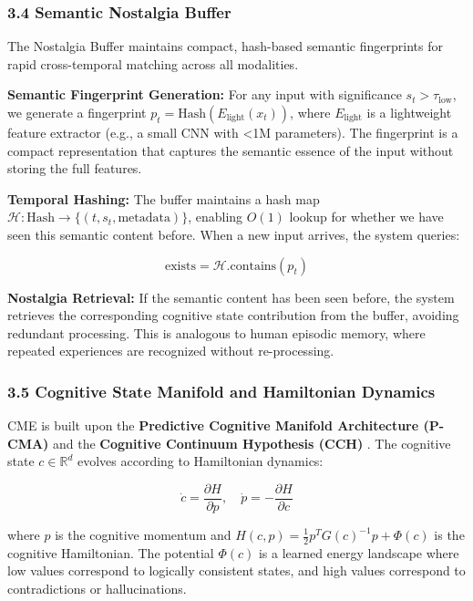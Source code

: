 \documentclass[
  11pt,
  a4paper,
]{article}
\begin{document}
\subsubsection{3.4 Semantic Nostalgia
Buffer}\label{semantic-nostalgia-buffer}

The Nostalgia Buffer maintains compact, hash-based semantic fingerprints
for rapid cross-temporal matching across all modalities.

\textbf{Semantic Fingerprint Generation:} For any input with
significance \(s_t > \tau_{\text{low}}\), we generate a fingerprint
\(p_t = \text{Hash}(E_{\text{light}}(x_t))\), where \(E_{\text{light}}\)
is a lightweight feature extractor (e.g., a small CNN with \textless1M
parameters). The fingerprint is a compact representation that captures
the semantic essence of the input without storing the full features.

\textbf{Temporal Hashing:} The buffer maintains a hash map
\(\mathcal{H}: \text{Hash} \to \{(t, s_t, \text{metadata})\}\), enabling
\(O(1)\) lookup for whether we have seen this semantic content before.
When a new input arrives, the system queries:

\[
\text{exists} = \mathcal{H}.\text{contains}(p_t)
\]

\textbf{Nostalgia Retrieval:} If the semantic content has been seen
before, the system retrieves the corresponding cognitive state
contribution from the buffer, avoiding redundant processing. This is
analogous to human episodic memory, where repeated experiences are
recognized without re-processing.

\subsubsection{3.5 Cognitive State Manifold and Hamiltonian
Dynamics}\label{cognitive-state-manifold-and-hamiltonian-dynamics}

CME is built upon the \textbf{Predictive Cognitive Manifold Architecture
(P-CMA)} and the \textbf{Cognitive Continuum Hypothesis (CCH)} . The
cognitive state \(c \in \mathbb{R}^{d}\) evolves according to
Hamiltonian dynamics:

\[
\dot{c} = \frac{\partial H}{\partial p}, \quad \dot{p} = -\frac{\partial H}{\partial c}
\]

where \(p\) is the cognitive momentum and
\(H(c, p) = \frac{1}{2} p^T G(c)^{-1} p + \Phi(c)\) is the cognitive
Hamiltonian. The potential \(\Phi(c)\) is a learned energy landscape
where low values correspond to logically consistent states, and high
values correspond to contradictions or hallucinations.
\end{document}
